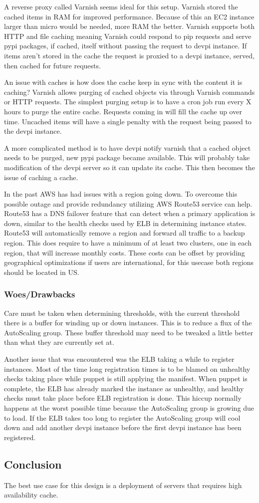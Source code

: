 \documentclass[12pt, letterpaper]{article}
\begin{document}
A reverse proxy called Varnish seems ideal for this setup. Varnish stored the cached items in RAM for improved performance. Because
of this an EC2 instance larger than micro would be needed, more RAM the better. Varnish supports both HTTP and file caching meaning
Varnish could respond to pip requests and serve pypi packages, if cached, itself without passing the request to devpi instance. If items
aren't stored in the cache the request is proxied to a devpi instance, served, then cached for future requests. 

An issue with caches is how does the cache keep in sync with the content it is caching? Varnish allows purging of cached objects via through
Varnish commands or HTTP requests. The simplest purging setup is to have a cron job run every X hours to purge the entire cache. Requests coming 
in will fill the cache up over time. Uncached items will have a single penalty with the request being passed to the devpi instance.

A more complicated method is to have devpi notify varnish that a cached object needs to be purged, new pypi package became available. This
will probably take modification of the devpi server so it can update its cache. This then becomes the issue of caching a cache.

In the past AWS has had issues with a region going down. To overcome this possible outage and provide redundancy utilizing AWS Route53
service can help. Route53 has a DNS failover feature that can detect when a primary application is down, similar to the health checks used
by ELB in determining instance states. Route53 will automatically remove a region and forward all traffic to a backup region. This does
require to have a minimum of  at least two clusters, one in each region, that will increase monthly costs. These costs can be offset by 
providing geographical optimizations if users are international, for this usecase both regions should be located in US.

\subsubsection{Woes/Drawbacks}
Care must be taken when determining thresholds, with the current threshold there is a buffer for winding up or down instances. This
is to reduce a flux of the AutoScaling group. These buffer threshold may need to be tweaked a little better than what they are
currently set at.

Another issue that was encountered was the ELB taking a while to register instances. Most of the time long registration times is
to be blamed on unhealthy checks taking place while puppet is still applying the manifest. When puppet is complete, the ELB has 
already marked the instance as unhealthy, and healthy checks must take place before ELB registration is done. This hiccup 
normally happens at the worst possible time because the AutoScaling group is growing due to load. If the ELB takes too long to 
register the AutoScaling group will cool down and add another devpi instance before the first devpi instance has been registered.  

\subsection{Conclusion}
The best use case for this design is a deployment of servers that requires high availability cache.
\end{document}
